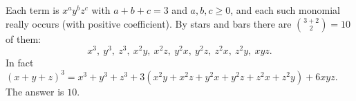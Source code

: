 Each term is $x^ay^bz^c$ with $a+b+c=3$ and $a,b,c\ge0$, and each such monomial really occurs (with positive coefficient). By stars and bars there are $\binom{3+2}{2}=10$ of them:
\[
x^3,\ y^3,\ z^3,\ x^2y,\ x^2z,\ y^2x,\ y^2z,\ z^2x,\ z^2y,\ xyz .
\]
In fact $(x+y+z)^3=x^3+y^3+z^3+3(x^2y+x^2z+y^2x+y^2z+z^2x+z^2y)+6xyz$. The answer is $\boxed{10}$.
